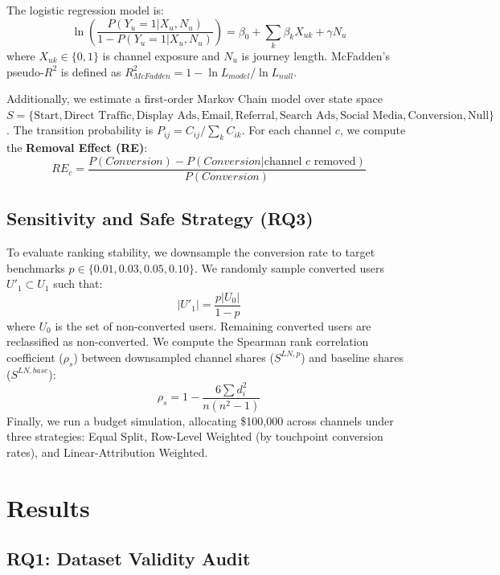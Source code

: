 \documentclass[pdflatex,sn-basic,Numbered]{sn-jnl}
\begin{document}
The logistic regression model is:
\begin{equation}
\ln\left(\frac{P(Y_u=1 | X_u, N_u)}{1 - P(Y_u=1 | X_u, N_u)}\right) = \beta_0 + \sum_k \beta_k X_{uk} + \gamma N_u
\end{equation}
where $X_{uk} \in \{0, 1\}$ is channel exposure and $N_u$ is journey length. McFadden's pseudo-$R^2$ is defined as $R^2_{McFadden} = 1 - \ln L_{model} / \ln L_{null}$.

Additionally, we estimate a first-order Markov Chain model over state space $S = \{\text{Start}, \text{Direct Traffic}, \text{Display Ads}, \text{Email}, \text{Referral}, \text{Search Ads}, \text{Social Media}, \text{Conversion}, \text{Null}\}$. The transition probability is $P_{ij} = C_{ij} / \sum_k C_{ik}$. For each channel $c$, we compute the \textbf{Removal Effect (RE)}:
\begin{equation}
RE_c = \frac{P(Conversion) - P(Conversion | \text{channel } c \text{ removed})}{P(Conversion)}
\end{equation}

\subsection{Sensitivity and Safe Strategy (RQ3)}

To evaluate ranking stability, we downsample the conversion rate to target benchmarks $p \in \{0.01, 0.03, 0.05, 0.10\}$. We randomly sample converted users $U'_1 \subset U_1$ such that:
\begin{equation}
|U'_1| = \frac{p |U_0|}{1 - p}
\end{equation}
where $U_0$ is the set of non-converted users. Remaining converted users are reclassified as non-converted. We compute the Spearman rank correlation coefficient ($\rho_s$) between downsampled channel shares ($S^{LN, p}$) and baseline shares ($S^{LN, base}$):
\begin{equation}
\rho_s = 1 - \frac{6 \sum d_i^2}{n(n^2 - 1)}
\end{equation}
Finally, we run a budget simulation, allocating \$100,000 across channels under three strategies: Equal Split, Row-Level Weighted (by touchpoint conversion rates), and Linear-Attribution Weighted.

\section{Results}\label{sec:results}

\subsection{RQ1: Dataset Validity Audit}
\end{document}

